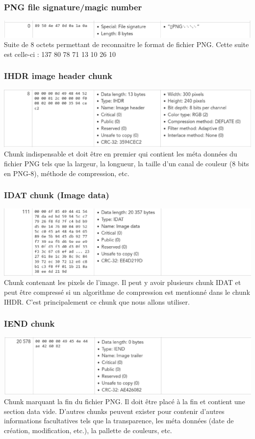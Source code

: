\subsubsection{PNG file signature/magic number}
\includegraphics[width=1\textwidth]{img/png_magic_number.eps}
Suite de 8 octets permettant de reconnaitre le format de fichier PNG. Cette suite est celle-ci : 137 80 78 71 13 10 26 10


\subsubsection{IHDR image header chunk}
\includegraphics[width=1\textwidth]{img/png_ihdr.eps}
Chunk indispensable et doit être en premier qui contient les méta données du fichier PNG tels que la largeur, la longueur, la taille d'un canal de couleur (8 bits en PNG-8), méthode de compression, etc.


\subsubsection{IDAT chunk (Image data)}
\includegraphics[width=1\textwidth]{img/png_idat.eps}
Chunk contenant les pixels de l'image. Il peut y avoir plusieurs chunk IDAT et peut être compressé si un algorithme de compression est mentionné dans le chunk IHDR. C'est principalement ce chunk que nous allons utiliser.


\subsubsection{IEND chunk}
\includegraphics[width=1\textwidth]{img/png_iend.eps}
Chunk marquant la fin du fichier PNG. Il doit être placé à la fin et contient une section data vide.
\newline
D'autres chunks peuvent exister pour contenir d'autres informations facultatives tels que la transparence, les méta données (date de création, modification, etc.), la pallette de couleurs, etc.

